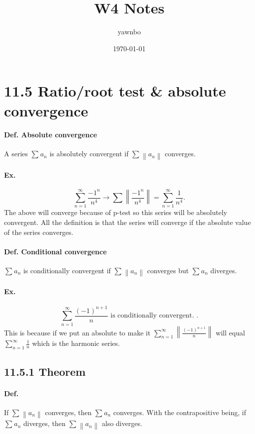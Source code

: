 \documentclass[a4paper]{article}
\title{W4 Notes}
\author{yawnbo}
\date{\today}
\begin{document}
\maketitle
\section*{11.5 Ratio/root test \& absolute convergence}%
\label{sec:11.5 Ratio/root test}
\paragraph{Def. Absolute convergence}
A series $ \sum_{  } ^{  } a_n $ is absolutely convergent if $ \sum_{  } ^{  } \left\| a_n \right\| $ converges.
\paragraph{Ex.}
\[
\sum_{ n=1 } ^{ \infty } \frac{ -1^{ n } }{ n^{ 4 } } \to \sum_{  } ^{  } \left\| \frac{ -1^{ n } }{ n^{ 4 } } \right\| = \sum_{ n=1 } ^{ \infty } \frac{ 1 }{ n^{ 4 } } 
.\] 
The above will converge because of p-test so this series will be absolutely convergent. All the definition is that the series will converge if the absolute value of the series converges. \\

\paragraph{Def. Conditional convergence}
$ \sum_{  } ^{  } a_n $ is conditionally convergent if $ \sum_{  } ^{  } \left\| a_n \right\| $ converges but $ \sum_{ } ^{  } a_n $ diverges. 

\paragraph{Ex.}
\[
	\sum_{ n=1 } ^{ \infty } \frac{ \left( -1 \right) ^{ n+1 } }{ n } \text{ is conditionally convergent.  }
.\] 
This is because if we put an absolute to make it $ \sum_{ n=1 } ^{ \infty } \left\| \frac{ \left( -1 \right) ^{ n+1 } }{ n } \right\| $ will equal $ \sum_{ n=1 } ^{ \infty } \frac{ 1 }{ n }  $ which is the harmonic series.

\subsection*{11.5.1 Theorem}%
\label{sub:11.5.1 Theorem}
\paragraph{Def.}
If $ \sum_{  } ^{  } \left\| a_n \right\| $ converges, then $ \sum_{  } ^{  } a_n $ converges. With the contrapositive being, if $ \sum_{  } ^{  } a_n $ diverges, then $ \sum_{  } ^{  } \left\| a_n \right\| $ also diverges. 
\end{document}
